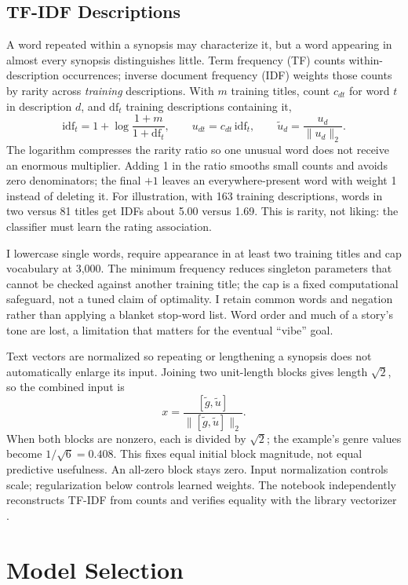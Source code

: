 \documentclass[11pt,letterpaper]{article}
\begin{document}
\subsection{TF-IDF Descriptions}
A word repeated within a synopsis may characterize it, but a word appearing in almost every synopsis distinguishes little. Term frequency (TF) counts within-description occurrences; inverse document frequency (IDF) weights those counts by rarity across \emph{training} descriptions. With $m$ training titles, count $c_{dt}$ for word $t$ in description $d$, and $\mathrm{df}_t$ training descriptions containing it,
\[
\mathrm{idf}_t=1+\log\frac{1+m}{1+\mathrm{df}_t},\qquad
u_{dt}=c_{dt}\,\mathrm{idf}_t,\qquad
\tilde u_d=\frac{u_d}{\lVert u_d\rVert_2}.
\]
The logarithm compresses the rarity ratio so one unusual word does not receive an enormous multiplier. Adding 1 in the ratio smooths small counts and avoids zero denominators; the final $+1$ leaves an everywhere-present word with weight 1 instead of deleting it. For illustration, with 163 training descriptions, words in two versus 81 titles get IDFs about 5.00 versus 1.69. This is rarity, not liking: the classifier must learn the rating association.

I lowercase single words, require appearance in at least two training titles and cap vocabulary at 3,000. The minimum frequency reduces singleton parameters that cannot be checked against another training title; the cap is a fixed computational safeguard, not a tuned claim of optimality. I retain common words and negation rather than applying a blanket stop-word list. Word order and much of a story's tone are lost, a limitation that matters for the eventual ``vibe'' goal.

Text vectors are normalized so repeating or lengthening a synopsis does not automatically enlarge its input. Joining two unit-length blocks gives length $\sqrt2$, so the combined input is
\[
x=\frac{[\tilde g,\tilde u]}{\lVert[\tilde g,\tilde u]\rVert_2}.
\]
When both blocks are nonzero, each is divided by $\sqrt2$; the example's genre values become $1/\sqrt6=0.408$. This fixes equal initial block magnitude, not equal predictive usefulness. An all-zero block stays zero. Input normalization controls scale; regularization below controls learned weights. The notebook independently reconstructs TF-IDF from counts and verifies equality with the library vectorizer \cite{sklearntext}.

\section{Model Selection}
\end{document}
